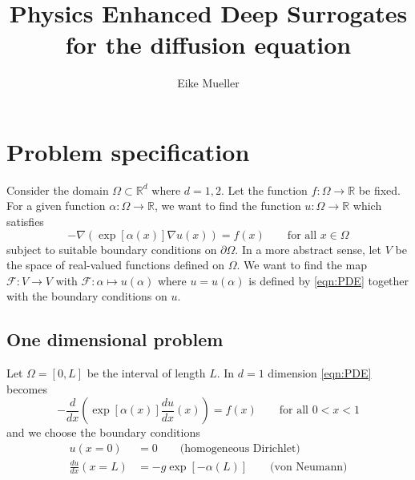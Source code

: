 \documentclass[11pt]{article}
\title{Physics Enhanced Deep Surrogates for the diffusion equation}
\author{Eike Mueller}
\begin{document}
\maketitle
\section{Problem specification}
Consider the domain $\Omega\subset \mathbb{R}^{d}$ where $d=1,2$. Let the function $f:\Omega\rightarrow \mathbb{R}$ be fixed. For a given function $\alpha:\Omega\rightarrow \mathbb{R}$, we want to find the function $u:\Omega\rightarrow\mathbb{R}$ which satisfies
\begin{equation}
        -\nabla\left(\exp[\alpha(x)]\nabla u(x)\right) = f(x)\qquad\text{for all $x\in \Omega$}
        \label{eqn:PDE}
\end{equation}
subject to suitable boundary conditions on $\partial\Omega$.
In a more abstract sense, let $V$ be the space of real-valued functions defined on $\Omega$. We want to find the map $\mathcal{F} : V\rightarrow V$ with $\mathcal{F}:\alpha \mapsto u(\alpha)$ where $u=u(\alpha)$ is defined by \eqref{eqn:PDE} together with the boundary conditions on $u$.
\subsection{One dimensional problem}
Let $\Omega=[0,L]$ be the interval of length $L$. In $d=1$ dimension \eqref{eqn:PDE} becomes
\begin{equation}
    -\frac{d}{dx}\left(\exp[\alpha(x)]\frac{du}{dx}(x)\right) = f(x)\qquad\text{for all $0<x<1$}
    \label{eqn:PDE_1d}
\end{equation}
and we choose the boundary conditions 
\begin{equation}
    \begin{aligned}
    u(x=0) &=0 \qquad{\text{(homogeneous Dirichlet)}}\\
    \frac{du}{dx}(x=L) &=-g\exp[-\alpha(L)] \qquad{\text{(von Neumann)}}
    \end{aligned}
    \label{eqn:boundary_condition_1d}
\end{equation}
\end{document}
